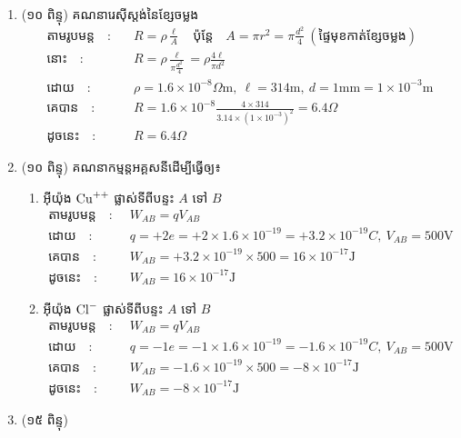 \documentclass{classes/exam}
\begin{document}
\begin{enumerate}[I]
	\item {\color{magenta}\ks (១០ ពិន្ទុ)} គណនារេស៊ីស្តង់នៃខ្សែចម្លង
	\begin{align*}
		\text{តាមរូបមន្ត}\quad :&\quad R=\rho\frac{\ell}{A}\quad
		\text{ប៉ុន្តែ}\quad A=\pi r^{2}=\pi\frac{d^{2}}{4}~(\text{ផ្ទៃមុខកាត់ខ្សែចម្លង})\\
		\text{នោះ}\quad :&\quad R=\rho\frac{\ell}{\pi\frac{d^{2}}{4}}=\rho\frac{4\ell}{\pi d^{2}}\\
		\text{ដោយ}\quad :&\quad \rho=1.6\times10^{-8}\Omega\si{\metre},~\ell=314\si{\metre},~d=1\si{\milli\metre}=1\times10^{-3}\si{\metre}\\
		\text{គេបាន}\quad :&\quad R=1.6\times10^{-8}\frac{4\times 314}{3.14\times \left(1\times10^{-3}\right)^{2}}=6.4\Omega\\
		\text{ដូចនេះ}\quad :&\quad R=6.4\Omega
	\end{align*} 
	\item {\color{magenta}\ks (១០ ពិន្ទុ)} គណនាកម្មន្តអគ្គសនីដើម្បីធ្វើឲ្យ៖ 
	\begin{enumerate}[k]
		\item អ៊ីយ៉ុង $\ce{Cu^{++}}$ ផ្លាស់ទីពីបន្ទះ $A$ ទៅ $B$
		\begin{align*}
			\text{តាមរូបមន្ត}\quad :&\quad W_{AB}=qV_{AB}\\
			\text{ដោយ}\quad :&\quad q=+2e=+2\times 1.6\times10^{-19}=+3.2\times 10^{-19}\si{C},~V_{AB}=500\si{\volt}\\
			\text{គេបាន}\quad :&\quad W_{AB}=+3.2\times 10^{-19}\times 500=16\times10^{-17}\si{\joule}\\
			\text{ដូចនេះ}\quad :&\quad W_{AB}=16\times10^{-17}\si{\joule}
		\end{align*}
			\item អ៊ីយ៉ុង $\ce{Cl^{-}}$ ផ្លាស់ទីពីបន្ទះ $A$ ទៅ $B$
		\begin{align*}
			\text{តាមរូបមន្ត}\quad :&\quad W_{AB}=qV_{AB}\\
			\text{ដោយ}\quad :&\quad q=-1e=-1\times 1.6\times10^{-19}=-1.6\times 10^{-19}\si{C},~V_{AB}=500\si{\volt}\\
			\text{គេបាន}\quad :&\quad W_{AB}=-1.6\times 10^{-19}\times 500=-8\times10^{-17}\si{\joule}\\
			\text{ដូចនេះ}\quad :&\quad W_{AB}=-8\times10^{-17}\si{\joule}
		\end{align*}
	\end{enumerate}
	\item {\color{magenta}\ks (១៥ ពិន្ទុ)}
	\begin{enumerate}[k]

\end{enumerate}
\end{enumerate}
\end{document}
